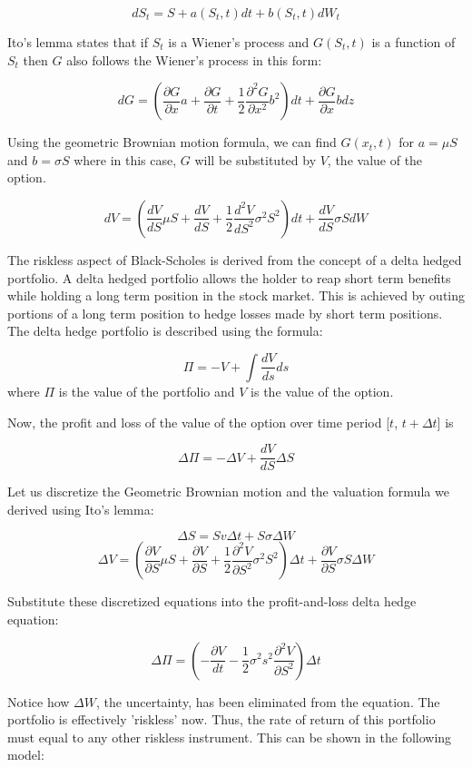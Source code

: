 \[ dS_t = S +  a(S_t, t)dt + b(S_t, t)dW_t \]


Ito's lemma states that if $S_t$ is a Wiener's process and $G(S_t, t)$ is a function of $S_t$ then $G$ also follows the Wiener's process in this form:

\[ dG = \left(\frac{\partial G}{\partial x}a + \frac{\partial G}{\partial t} + \frac{1}{2}\frac{\partial^2G}{\partial x^2}b^2\right)dt + \frac{\partial G}{\partial x}bdz\]

Using the geometric Brownian motion formula, we can find $G(x_t, t)$ for $a = \mu S$ and $b = \sigma S$ where in this case, $G$ will be substituted by $V$, the value of the option.

\[ dV = \left(\frac{dV}{dS}\mu S + \frac{dV}{dS} + \frac{1}{2}\frac{d^2V}{dS^2}\sigma^2S^2\right)dt + \frac{dV}{dS}\sigma SdW\]


The riskless aspect of Black-Scholes is derived from the concept of a delta hedged portfolio. A delta hedged portfolio allows the holder to reap short term benefits while holding a long term position in the stock market. This is achieved by outing portions of a long term position to hedge losses made by short term positions. The delta hedge portfolio is described using the formula: 

\[\Pi = -V + \int \frac{dV}{ds}ds\] where $\Pi$ is the value of the portfolio and $V$ is the value of the option.  

Now, the profit and loss of the value of the option over time period [$t$, $t + \Delta t$] is

\[ \Delta \Pi = -\Delta V + \frac{dV}{dS}\Delta S \] 

Let us discretize the Geometric Brownian motion and the valuation formula we derived using Ito's lemma: 

\[ \Delta S = Sv \Delta t + S\sigma \Delta W\]
\[ \Delta V = \left(\frac{\partial V}{\partial S}\mu S + \frac{\partial V}{\partial S} + \frac{1}{2}\frac{\partial^2V}{\partial S^2}\sigma^2S^2\right)\Delta t + \frac{\partial V}{\partial S}\sigma S \Delta W\]

Substitute these discretized equations into the profit-and-loss delta hedge equation: 

\[ \Delta \Pi = \left(- \frac{\partial V}{dt} - \frac{1}{2} \sigma^2 s^2 \frac{\partial^2V}{\partial S^2}\right)\Delta t\]

Notice how $\Delta W$, the uncertainty, has been eliminated from the equation. The portfolio is effectively 'riskless' now. Thus, the rate of return of this portfolio must equal to any other riskless instrument. This can be shown in the following model:

